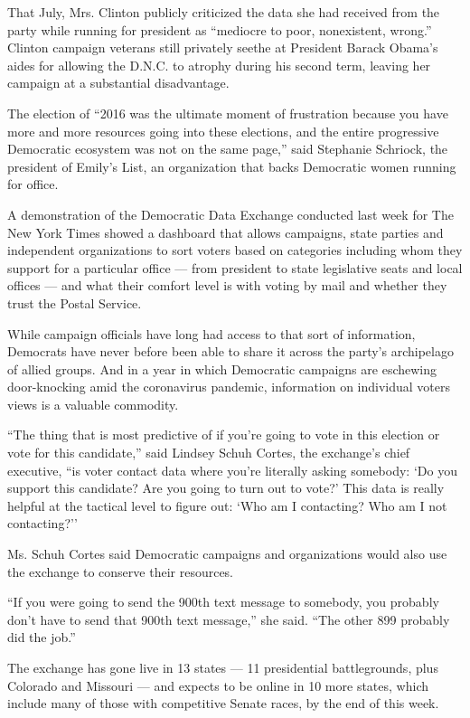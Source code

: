That July, Mrs. Clinton publicly criticized the data she had received
from the party while running for president as ``mediocre to poor,
nonexistent, wrong.'' Clinton campaign veterans still privately seethe
at President Barack Obama's aides for allowing the D.N.C. to atrophy
during his second term, leaving her campaign at a substantial
disadvantage.

The election of ``2016 was the ultimate moment of frustration because
you have more and more resources going into these elections, and the
entire progressive Democratic ecosystem was not on the same page,'' said
Stephanie Schriock, the president of Emily's List, an organization that
backs Democratic women running for office.

A demonstration of the Democratic Data Exchange conducted last week for
The New York Times showed a dashboard that allows campaigns, state
parties and independent organizations to sort voters based on categories
including whom they support for a particular office --- from president
to state legislative seats and local offices --- and what their comfort
level is with voting by mail and whether they trust the Postal Service.

While campaign officials have long had access to that sort of
information, Democrats have never before been able to share it across
the party's archipelago of allied groups. And in a year in which
Democratic campaigns are eschewing door-knocking amid the coronavirus
pandemic, information on individual voters views is a valuable
commodity.

``The thing that is most predictive of if you're going to vote in this
election or vote for this candidate,'' said Lindsey Schuh Cortes, the
exchange's chief executive, ``is voter contact data where you're
literally asking somebody: `Do you support this candidate? Are you going
to turn out to vote?' This data is really helpful at the tactical level
to figure out: `Who am I contacting? Who am I not contacting?''

Ms. Schuh Cortes said Democratic campaigns and organizations would also
use the exchange to conserve their resources.

``If you were going to send the 900th text message to somebody, you
probably don't have to send that 900th text message,'' she said. ``The
other 899 probably did the job.''

The exchange has gone live in 13 states --- 11 presidential
battlegrounds, plus Colorado and Missouri --- and expects to be online
in 10 more states, which include many of those with competitive Senate
races, by the end of this week.

